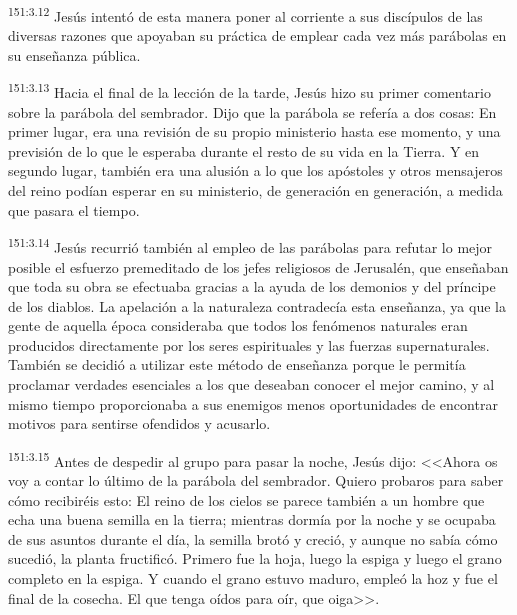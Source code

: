 \par 
\textsuperscript{151:3.12} Jesús intentó de esta manera poner al corriente a sus discípulos de las diversas razones que apoyaban su práctica de emplear cada vez más parábolas en su enseñanza pública.

\par 
\textsuperscript{151:3.13} Hacia el final de la lección de la tarde, Jesús hizo su primer comentario sobre la parábola del sembrador. Dijo que la parábola se refería a dos cosas: En primer lugar, era una revisión de su propio ministerio hasta ese momento, y una previsión de lo que le esperaba durante el resto de su vida en la Tierra. Y en segundo lugar, también era una alusión a lo que los apóstoles y otros mensajeros del reino podían esperar en su ministerio, de generación en generación, a medida que pasara el tiempo.

\par 
\textsuperscript{151:3.14} Jesús recurrió también al empleo de las parábolas para refutar lo mejor posible el esfuerzo premeditado de los jefes religiosos de Jerusalén, que enseñaban que toda su obra se efectuaba gracias a la ayuda de los demonios y del príncipe de los diablos. La apelación a la naturaleza contradecía esta enseñanza, ya que la gente de aquella época consideraba que todos los fenómenos naturales eran producidos directamente por los seres espirituales y las fuerzas supernaturales. También se decidió a utilizar este método de enseñanza porque le permitía proclamar verdades esenciales a los que deseaban conocer el mejor camino, y al mismo tiempo proporcionaba a sus enemigos menos oportunidades de encontrar motivos para sentirse ofendidos y acusarlo.

\par 
\textsuperscript{151:3.15} Antes de despedir al grupo para pasar la noche, Jesús dijo: <<Ahora os voy a contar lo último de la parábola del sembrador. Quiero probaros para saber cómo recibiréis esto: El reino de los cielos se parece también a un hombre que echa una buena semilla en la tierra; mientras dormía por la noche y se ocupaba de sus asuntos durante el día, la semilla brotó y creció, y aunque no sabía cómo sucedió, la planta fructificó. Primero fue la hoja, luego la espiga y luego el grano completo en la espiga. Y cuando el grano estuvo maduro, empleó la hoz y fue el final de la cosecha. El que tenga oídos para oír, que oiga>>.

